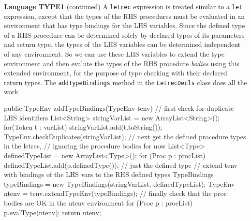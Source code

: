 \begin{minipage}[t]{\sw}
\slidenumber
\LARGE
{\bf Language TYPE1} (continued)\exx
\Large
A \verb'letrec' expression is treated similar
to a \verb'let' expression,
except that the types of the RHS procedures
must be evaluated in an environment
that has type bindings for the LHS variables.
Since the defined type of a RHS procedure can be determined
solely by declared types of its parameters and return type,
the types of the LHS variables can be determined
independent of any environment.
So we can use these LHS variables to extend
the type environment
and then evalute the types of the RHS procedure {\em bodies}
using this extended environment,
for the purpose of type checking with their declared return types.
The \verb'addTypeBindings' method in the \verb'LetrecDecls' class
does all the work.
\large
\begin{qv}
public TypeEnv addTypeBindings(TypeEnv tenv) {
    // first check for duplicate LHS identifiers
    List<String> stringVarList = new ArrayList<String>();
    for(Token t : varList)
        stringVarList.add(t.toString());
    TypeEnv.checkDuplicates(stringVarList);
    // next get the defined procedure types in the letrec,
    // ignoring the procedure bodies for now
    List<Type> definedTypeList = new ArrayList<Type>();
    for (Proc p : procList)
        definedTypeList.add(p.definedType()); // just the defined type
    // extend tenv with bindings of the LHS vars to the RHS defined types
    TypeBindings typeBindings =
        new TypeBindings(stringVarList, definedTypeList);
    TypeEnv ntenv = tenv.extendTypeEnv(typeBindings);
    // finally check that the proc bodies are OK in the ntenv environment
    for (Proc p : procList)
         p.evalType(ntenv);
    return ntenv;
}
\end{qv}
\end{minipage}
